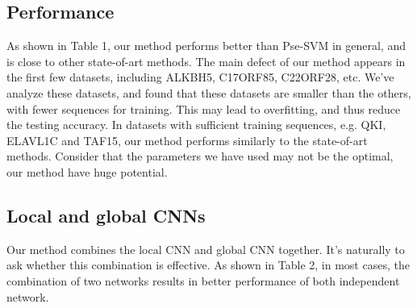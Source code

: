 \documentclass[twoside,twocolumn]{article}
\begin{document}
\subsection{Performance}
As shown in Table 1, our method performs better than Pse-SVM in general,
and is close to other state-of-art methods. The main defect of our method
appears in the first few datasets, including ALKBH5, C17ORF85, C22ORF28, etc.
We've analyze these datasets, and found that these datasets are smaller than the
others, with fewer sequences for training. This may lead to overfitting, and thus
reduce the testing accuracy.
In datasets with sufficient training sequences, e.g. QKI, ELAVL1C and TAF15, our
method performs similarly to the state-of-art methods. Consider that the parameters
we have used may not be the optimal, our method have huge potential.

\subsection{Local and global CNNs}
Our method combines the local CNN and global CNN together. It's naturally to ask
whether this combination is effective. As shown in Table 2, in most cases, the 
combination of two networks results in better performance of both independent
network. 
\end{document}
